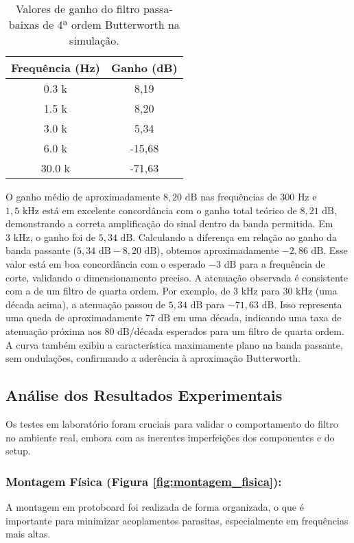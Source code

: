 \begin{table}[H]
\centering
\begin{tabular}{|c|c|}
\hline
\textbf{Frequência (Hz)} & \textbf{Ganho (dB)} \\
\hline
0.3 k & 8,19 \\ \hline
1.5 k & 8,20 \\ \hline
3.0 k & 5,34 \\ \hline
6.0 k & -15,68 \\ \hline
30.0 k & -71,63 \\ \hline
\end{tabular}
\caption{Valores de ganho do filtro passa-baixas de 4ª ordem Butterworth na simulação.}
\label{tab:ganho_simulacao}
\end{table}

O ganho médio de aproximadamente $8,20 \text{ dB}$ nas frequências de $300 \text{ Hz}$ e $1,5 \text{ kHz}$ está em excelente concordância com o ganho total teórico de $8,21 \text{ dB}$, demonstrando a correta amplificação do sinal dentro da banda permitida.
Em $3 \text{ kHz}$, o ganho foi de $5,34 \text{ dB}$. Calculando a diferença em relação ao ganho da banda passante ($5,34 \text{ dB} - 8,20 \text{ dB}$), obtemos aproximadamente $-2,86 \text{ dB}$. Esse valor está em boa concordância com o esperado $-3 \text{ dB}$ para a frequência de corte, validando o dimensionamento preciso.
A atenuação observada é consistente com a de um filtro de quarta ordem. Por exemplo, de $3 \text{ kHz}$ para $30 \text{ kHz}$ (uma década acima), a atenuação passou de $5,34 \text{ dB}$ para $-71,63 \text{ dB}$. Isso representa uma queda de aproximadamente $77 \text{ dB}$ em uma década, indicando uma taxa de atenuação próxima aos $80 \text{ dB/década}$ esperados para um filtro de quarta ordem. A curva também exibiu a característica maximamente plano na banda passante, sem ondulações, confirmando a aderência à aproximação Butterworth.

\subsection{Análise dos Resultados Experimentais}
Os testes em laboratório foram cruciais para validar o comportamento do filtro no ambiente real, embora com as inerentes imperfeições dos componentes e do setup.

\subsubsection{Montagem Física (Figura \ref{fig:montagem_fisica}):} 
A montagem em protoboard foi realizada de forma organizada, o que é importante para minimizar acoplamentos parasitas, especialmente em frequências mais altas.

